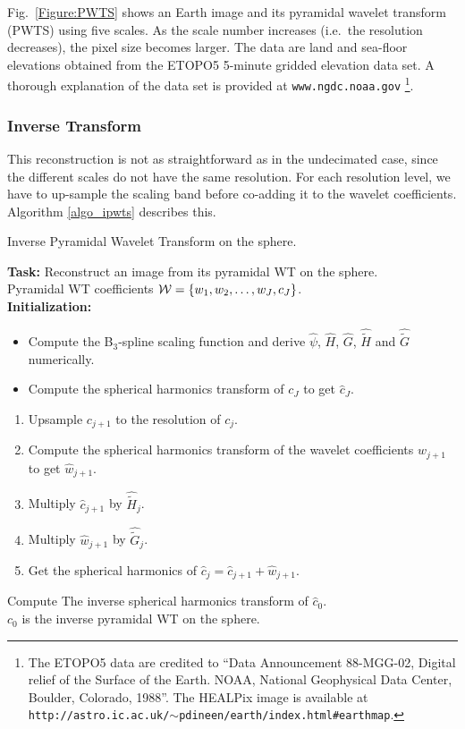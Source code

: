 Fig.~\ref{Figure:PWTS} shows an Earth image and its pyramidal wavelet transform (PWTS) using five scales.
As the scale number increases (i.e.\ the resolution decreases), the pixel size becomes larger. The data are  land and sea-floor elevations  obtained from the ETOPO5 5-minute gridded elevation data set. A thorough explanation of the data set is provided at \texttt{www.ngdc.noaa.gov} \footnote{The ETOPO5 data are credited to ``Data Announcement 88-MGG-02, Digital relief of the Surface of the Earth. NOAA, National Geophysical Data Center, Boulder, Colorado, 1988''.   The HEALPix image is available at \texttt{http://astro.ic.ac.uk/$\sim$pdineen/earth/index.html\#earthmap}.}.


\newpage
\subsubsection{Inverse Transform}
 
This reconstruction is not as straightforward as in the undecimated case, since the different scales do not have the same resolution.
For each resolution level, we have to up-sample the scaling band before co-adding it to the wavelet coefficients. Algorithm \ref{algo_ipwts} describes this.
{\linespread{1}
\begin{algorithm}[h]
\caption{Inverse Pyramidal Wavelet Transform on the sphere.}
\label{algo_ipwts}
{\bf Task:} Reconstruct an image from its pyramidal WT on the sphere.\\
 Pyramidal WT coefficients ${\cal W}=\{w_1, w_2, \dots, w_{J}, c_{J}\}$.\\
{\bf Initialization:}
\begin{itemize}
\item Compute the B$_3$-spline scaling function and derive $\hat{\psi}$, $\widehat{H}$, $\widehat{G}$, $\widehat{\tilde H}$ and $\widehat{\tilde G}$ numerically.
\item Compute the spherical harmonics transform of $c_J$ to get ${\hat c}_J$.
\end{itemize}
 {
\begin{enumerate}[1.]
\item Upsample $c_{j+1}$ to the resolution of $c_j$.
\item Compute the spherical harmonics transform of the wavelet coefficients $w_{j+1}$ to get $\hat{w}_{j+1}$.
\item Multiply $\hat{c}_{j+1}$ by ${\widehat {\tilde H}}_{j}$.
\item Multiply $\hat{w}_{j+1}$ by ${\widehat {\tilde G}}_{j}$.
\item Get the spherical harmonics of $\hat{c}_j=\hat{c}_{j+1}+\hat{w}_{j+1}$.
\end{enumerate}
}
Compute The inverse spherical harmonics transform of $\hat c_0$.\\
 $c_0$ is the inverse pyramidal WT on the sphere.
\end{algorithm}
}
  
